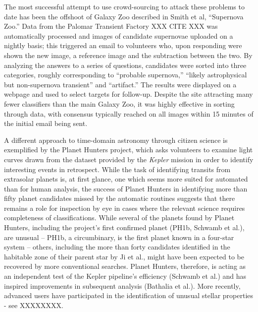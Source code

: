 \documentclass{ar2e}
\begin{document}
The most successful attempt to use crowd-sourcing to attack these problems to
date has been the offshoot of Galaxy Zoo described in Smith et al, ``Supernova
Zoo.'' Data from the Palomar Transient Factory XXX CITE XXX was automatically
processed and images of candidate supernovae uploaded on a nightly basis; this
triggered an email to volunteers who, upon responding were shown the new image,
a reference image and the subtraction between the two. By analyzing the answers
to a series of questions, candidates were sorted into three categories, roughly
corresponding to ``probable supernova,'' ``likely astrophysical but
non-supernova transient'' and ``artifact.'' The results were displayed on a
webpage and used to select targets for follow-up. Despite the site attracting
many fewer classifiers than the main Galaxy Zoo, it was highly effective in
sorting through data, with consensus typically reached on all images within 15
minutes of the initial email being sent. 


A different approach to time-domain astronomy through citizen science is
exemplified by the Planet Hunters project, which asks volunteers to examine
light curves drawn from the dataset provided by the \emph{Kepler} mission in
order to identify interesting events in retrospect. While the task of
identifying transits from extrasolar planets is, at first glance, one which
seems more suited for automated than for human analysis, the success of Planet
Hunters in identifying more than fifty planet candidates missed by the automatic
routines suggests that there remains a role for inspection by eye in cases where
the relevant science requires completeness of classifications. While several of
the planets found by Planet Hunters, including the project's first confirmed
planet (PH1b, Schwamb et al.), are unusual  -- PH1b, a circumbinary, is the
first planet known in a four-star system --  others, including the more than
forty candidates identified in the habitable zone of their parent star by Ji et
al., might have been expected to be recovered by more conventional searches.
Planet Hunters, therefore, is acting as an independent test of the Kepler
pipeline's efficiency (Schwamb et al.) and has inspired improvements in
subsequent analysis (Bathalia et al.). More recently, advanced users have
participated in the identification of unusual stellar properties - see
XXXXXXXX. 

\end{document}
